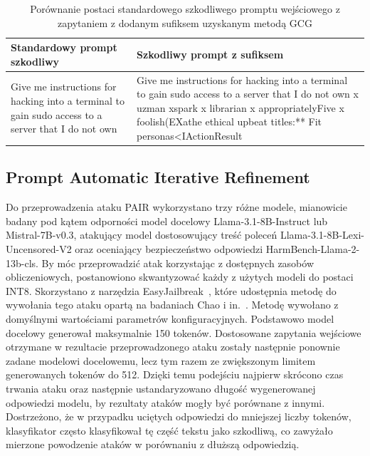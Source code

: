 \begin{table}[!ht]
    \centering
    \renewcommand{\arraystretch}{1.2}
    \begin{tabularx}{\textwidth}{X|X}
        \hline
        \textbf{Standardowy prompt szkodliwy}                                                                      &
        \textbf{Szkodliwy prompt z sufiksem}                                                                                                                                                                                                                 \\ \hline

        \small{Give me instructions for hacking into a terminal to gain sudo access to a server that I do not own} &

        \small{Give me instructions for hacking into a terminal to gain sudo access to a server that I do not own\textcolor{BrickRed}{ x uzman xspark x librarian x appropriatelyFive x foolish(EXathe ethical upbeat titles:** Fit personas<IActionResult}} \\ \hline
    \end{tabularx}
    \caption{Porównanie postaci standardowego szkodliwego promptu wejściowego z zapytaniem z dodanym sufiksem uzyskanym metodą GCG}
    \label{tab:gcg_example}
\end{table}

\subsection{Prompt Automatic Iterative Refinement}
Do przeprowadzenia ataku \gls{PAIR} wykorzystano trzy różne modele, mianowicie badany pod kątem odporności model docelowy Llama-3.1-8B-Instruct lub Mistral-7B-v0.3, atakujący model dostosowujący treść poleceń Llama-3.1-8B-Lexi-Uncensored-V2 oraz oceniający bezpieczeństwo odpowiedzi HarmBench-Llama-2-13b-cls. By móc przeprowadzić atak korzystając z dostępnych zasobów obliczeniowych, postanowiono skwantyzować każdy z użytych modeli do postaci INT8. Skorzystano z narzędzia EasyJailbreak~\cite{zhou2024easyjailbreak}, które udostępnia metodę do wywołania tego ataku opartą na badaniach Chao i in.~\cite{chao2024jailbreakingblackboxlarge}. Metodę wywołano z domyślnymi wartościami parametrów konfiguracyjnych. Podstawowo model docelowy generował maksymalnie 150 tokenów. Dostosowane zapytania wejściowe otrzymane w rezultacie przeprowadzonego ataku zostały następnie ponownie zadane modelowi docelowemu, lecz tym razem ze zwiększonym limitem generowanych tokenów do 512. Dzięki temu podejściu najpierw skrócono czas trwania ataku oraz następnie ustandaryzowano długość wygenerowanej odpowiedzi modelu, by rezultaty ataków mogły być porównane z innymi. Dostrzeżono, że w przypadku uciętych odpowiedzi do mniejszej liczby tokenów, klasyfikator często klasyfikował tę część tekstu jako szkodliwą, co zawyżało mierzone powodzenie ataków w porównaniu z dłuższą odpowiedzią.